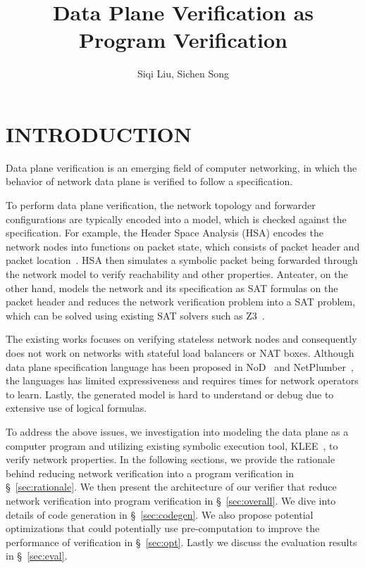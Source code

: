 \documentclass[letterpaper, 10 pt, conference]{ieeeconf}  %
\title{\LARGE \bf
Data Plane Verification as Program Verification
}
\author{Siqi Liu,
Sichen Song
}
\begin{document}
\maketitle
\thispagestyle{empty}
\pagestyle{empty}



\section{INTRODUCTION}
Data plane verification is an emerging field of computer networking, in which the behavior of network data plane is verified to follow a specification. 

To perform data plane verification, the network topology and forwarder configurations are typically encoded into a model, which is checked against the specification. For example, the Header Space Analysis (HSA) encodes the network nodes into functions on packet state, which consists of packet header and packet location~\cite{hsa}. HSA then simulates a symbolic packet being forwarded through the network model to verify reachability and other properties. Anteater, on the other hand, models the network and its specification as SAT formulas on the packet header and reduces the network verification problem into a SAT problem, which can be solved using existing SAT solvers such as Z3~\cite{z3}.

The existing works focuses on verifying stateless network nodes and consequently does not work on networks with stateful load balancers or NAT boxes. Although data plane specification language has been proposed in NoD~\cite{nod} and NetPlumber~\cite{netp}, the languages has limited expressiveness and requires times for network operators to learn. Lastly, the generated model is hard to understand or debug due to extensive use of logical formulas.

To address the above issues, we investigation into modeling the data plane as a computer program and utilizing existing symbolic execution tool, KLEE~\cite{klee}, to verify network properties. In the following sections, we provide the rationale behind reducing network verification into a program verification in \S~\ref{sec:rationale}. We then present the architecture of our verifier that reduce network verification into program verification in \S ~\ref{sec:overall}. We dive into details of code generation in \S~\ref{sec:codegen}. We also propose potential optimizations that could potentially use pre-computation to improve the performance of verification in \S~\ref{sec:opt}. Lastly we discuss the evaluation results in \S~\ref{sec:eval}.
\end{document}
